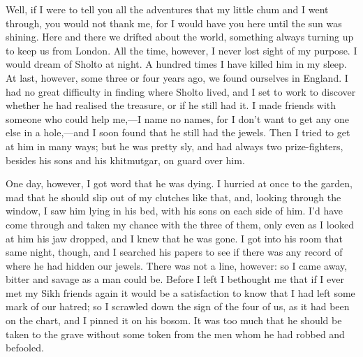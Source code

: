 Well, if I were to tell you all the adventures that my little chum and I went through, you would not thank me, for I would have you here until the sun was shining. Here and there we drifted about the world, something always turning up to keep us from London. All the time, however, I never lost sight of my purpose. I would dream of Sholto at night. A hundred times I have killed him in my sleep. At last, however, some three or four years ago, we found ourselves in England. I had no great difficulty in finding where Sholto lived, and I set to work to discover whether he had realised the treasure, or if he still had it. I made friends with someone who could help me,—I name no names, for I don't want to get any one else in a hole,—and I soon found that he still had the jewels. Then I tried to get at him in many ways; but he was pretty sly, and had always two prize-fighters, besides his sons and his khitmutgar, on guard over him.

One day, however, I got word that he was dying. I hurried at once to the garden, mad that he should slip out of my clutches like that, and, looking through the window, I saw him lying in his bed, with his sons on each side of him. I'd have come through and taken my chance with the three of them, only even as I looked at him his jaw dropped, and I knew that he was gone. I got into his room that same night, though, and I searched his papers to see if there was any record of where he had hidden our jewels. There was not a line, however: so I came away, bitter and savage as a man could be. Before I left I bethought me that if I ever met my Sikh friends again it would be a satisfaction to know that I had left some mark of our hatred; so I scrawled down the sign of the four of us, as it had been on the chart, and I pinned it on his bosom. It was too much that he should be taken to the grave without some token from the men whom he had robbed and befooled.

